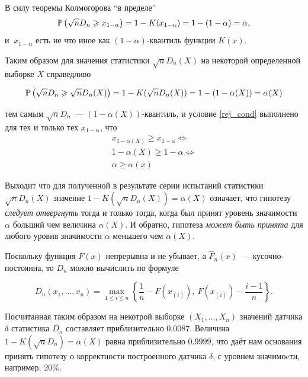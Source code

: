         В силу теоремы Колмогорова ``в пределе'' 
        \[\mathbb{P}\left(\sqrt{n}D_n \geqslant x_{1-\alpha}\right) = 1 - K(x_{1-\alpha}) = 
                                                    1 - (1-\alpha) = \alpha,\]
        и $\: x_{1-\alpha}$ есть не что иное как $(1-\alpha)$-квантиль функции 
        $K(x)$.                                                    

        Таким образом для значения статистики $\sqrt{n}D_n(X)$ на некоторой 
        определенной выборке $X$ справедливо

        \[\mathbb{P}\left(\sqrt{n}D_n \geqslant \sqrt{n}D_n(X)\right) = 1 - K(\sqrt{n}D_n(X)) = 
        1 - (1-\alpha(X)) = \alpha(X)\]

        тем самым $\sqrt{n}D_n$~--- $(1-\alpha(X))$-квантиль, и условие 
        \eqref{rej_cond} выполнено для тех и только тех $x_{1-\alpha}$, что 
        \begin{gather*}
            x_{1-\alpha(X)} \ge x_{1-\alpha} \Leftrightarrow \\
            1-\alpha(X) \ge 1-\alpha \Leftrightarrow \\
            \alpha \ge \alpha(x)
        \end{gather*}

        Выходит что для полученной в результате серии испытаний статистики 
        $\sqrt{n}D_n(X)$ значение $1 - K(\sqrt{n}D_n(X)) = \alpha(X)$ означает, 
        что гипотезу \emph{следует отвергнуть} тогда и только тогда, когда был 
        принят уровень значимости $\alpha$ больший чем величина $\alpha(X)$. И 
        обратно, гипотеза \emph{может быть принята} для любого уровня значимости 
        $\alpha$ меньшего чем $\alpha(X).$
        
        Поскольку функция $F(x)$ непрерывна и не убывает, а $\hat F_n(x)$~--- 
        кусочно-постоянна, то $D_n$ можно вычислить по формуле
        
        \[D_n(x_1,\ldots,x_n) = \max\limits_{1\le i \le n}
        \left\{\dfrac{1}{n} - F(x_{(i)}),\: F(x_{(i)}) - \dfrac{i-1}{n}\right\}.\]

        Посчитанная таким образом на некотрой выборке $(X_1,\ldots,X_n)$ 
        значений датчика $\delta$ статистика $D_n$ составляет приблизительно 
        $0.0087$. Величина $1-K(\sqrt{n}D_n) = \alpha(X)$ равна приблизительно 
        $0.9999$, что даёт нам основания принять гипотезу о корректности 
        построенного датчика $\delta$, с уровнем значимоcти, например, 20\%.

